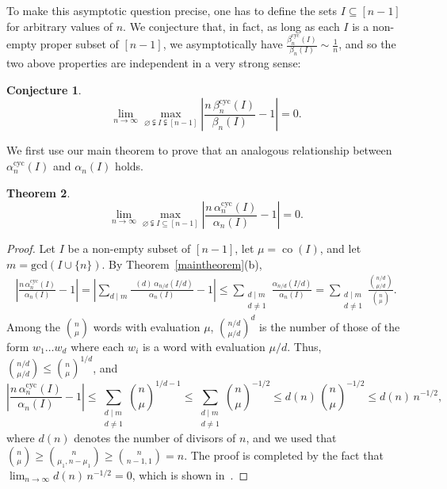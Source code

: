 \documentclass[12pt]{article}
\newcommand{\alphacyc}{\alpha^{\text{cyc}}}
\newcommand{\betacyc}{\beta^{\text{cyc}}}
\DeclareMathOperator{\mob}{M\ddot{o}b}
\DeclareMathOperator{\co}{co}
\newtheorem{thm}{Theorem}[section]
\newtheorem{conj}[thm]{Conjecture}
\theoremstyle{definition}
\newcommand{\sergi}[1]{\mbox{}{\sf\color{red}[#1]}\marginpar{\color{red}\Large$*$}}
\begin{document}
To make this asymptotic question precise, one has to define the sets $I \subseteq [n-1]$ for arbitrary values of $n$. We conjecture that, in fact, as long as each $I$ is a non-empty proper subset of $[n-1]$, we asymptotically have $\frac{\betacyc_n(I)}{\beta_n(I)} \sim \frac{1}{n}$, and so the two above properties are independent in a very strong sense:

\begin{conj} \label{Conjecture} $$\lim_{n\to\infty}\max_{\varnothing \subsetneqq I \subsetneqq [n-1]} \left| \frac{n\, \betacyc_n(I)}{\beta_n(I)} - 1\right| = 0.$$
\end{conj}

We first use our main theorem to prove that an analogous relationship between $\alphacyc_n(I)$ and $\alpha_n(I)$ holds.

\begin{thm} \label{AlphaTheorem} $$\lim_{n\to\infty}\max_{\varnothing \subsetneqq I \subseteq [n-1]} \left| \frac{n\, \alphacyc_n(I)}{\alpha_n(I)} - 1\right| = 0.$$
\end{thm}

\begin{proof}
Let $I$ be a non-empty subset of $[n-1]$, let $\mu = \co(I)$, and let $m = \text{gcd}(I \cup \{n\})$. By Theorem~\ref{maintheorem}(b), 
\begin{align*}
\left| \frac{n\, \alphacyc_n(I)}{\alpha_n(I)} - 1\right| = \left| \sum_{\text{$d \mid m$}} \frac{\mob(d)\,\alpha_{n/d}(I/d)}{\alpha_n(I)} - 1\right| 
\le \sum_{\substack{\text{$d \mid m$}\\d\not=1}} \frac{\alpha_{n/d}(I/d)}{\alpha_n(I)} = \sum_{\substack{\text{$d \mid m$}\\d\not=1}} \frac{\binom{n/d}{\mu/d}}{ \binom{n}{\mu}}.
\end{align*}
Among the $\binom{n}{\mu}$ words with evaluation $\mu$, $\binom{n/d}{\mu/d}^d$ is the number of those of the form $w_1 \dots w_d$ where each $w_i$ is a word with evaluation $\mu/d$. Thus, $\binom{n/d}{\mu/d} \le \binom{n}{\mu}^{1/d}$, and
$$\left| \frac{n\, \alphacyc_n(I)}{\alpha_n(I)} - 1\right| \le \sum_{\substack{\text{$d \mid m$}\\d\not=1}} \binom{n}{\mu}^{1/d-1} \le \sum_{\substack{\text{$d \mid m$}\\d\not=1}} \binom{n}{\mu}^{-1/2} \le d(n)\,\binom{n}{\mu}^{-1/2}\le d(n)\,n^{-1/2},
$$
where $d(n)$ denotes the number of divisors of $n$, and we used that $\binom{n}{\mu} \ge \binom{n}{\mu_1, n-\mu_1} \ge \binom{n}{n-1, 1} = n$.
The proof is completed by the fact that $\lim_{n\to\infty} d(n)\,n^{-1/2} = 0$, which is shown in~\cite[Sec.\ 13.10]{Apostol}.
\end{proof}
\end{document}
